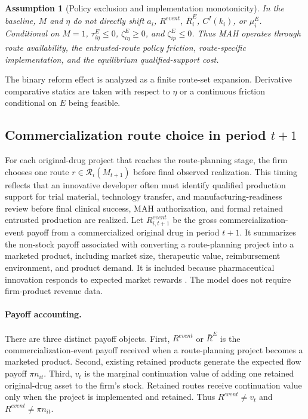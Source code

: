 \documentclass[12pt]{article}
\newtheorem{assumption}{Assumption}
\newcommand{\1}{\mathbf{1}}
\newcommand{\calR}{\mathcal{R}}
\begin{document}
\begin{assumption}[Policy exclusion and implementation monotonicity]
\label{ass:policy_exclusion}
In the baseline, $M$ and $\eta$ do not directly shift $a_i$, $R^{event}$, $\bar R_i^E$, $C^I(k_i)$, or $\mu_i^E$. Conditional on $M=1$, $\tau_{i\eta}^E\le0$, $\zeta_{i\eta}^E\ge0$, and $\zeta_{ip}^E\le0$. Thus MAH operates through route availability, the entrusted-route policy friction, route-specific implementation, and the equilibrium qualified-support cost.
\end{assumption}

The binary reform effect is analyzed as a finite route-set expansion. Derivative comparative statics are taken with respect to $\eta$ or a continuous friction conditional on $E$ being feasible.

\subsection{\texorpdfstring{Commercialization route choice in period $t+1$}{Commercialization route choice in period t+1}}

For each original-drug project that reaches the route-planning stage, the firm chooses one route $r\in\calR_i(M_{t+1})$ before final observed realization. This timing reflects that an innovative developer often must identify qualified production support for trial material, technology transfer, and manufacturing-readiness review before final clinical success, MAH authorization, and formal retained entrusted production are realized. Let $R^{event}_{i,t+1}$ be the gross commercialization-event payoff from a commercialized original drug in period $t+1$. It summarizes the non-stock payoff associated with converting a route-planning project into a marketed product, including market size, therapeutic value, reimbursement environment, and product demand. It is included because pharmaceutical innovation responds to expected market rewards \citep{AcemogluLinn2004,DuboisDeMouzonScottMortonSeabright2015,BarwickXiaXia2026}. The model does not require firm-product revenue data.

\paragraph{Payoff accounting.}
There are three distinct payoff objects. First, $R^{event}$ or $\bar R^E$ is the commercialization-event payoff received when a route-planning project becomes a marketed product. Second, existing retained products generate the expected flow payoff $\pi n_{it}$. Third, $v_t$ is the marginal continuation value of adding one retained original-drug asset to the firm's stock. Retained routes receive continuation value only when the project is implemented and retained. Thus $R^{event}\neq v_t$ and $R^{event}\neq \pi n_{it}$.
\end{document}
